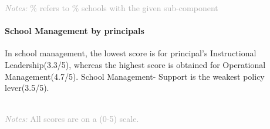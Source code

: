 \documentclass[
  twocolumn]{article}
\begin{document}
\begin{table}[H]
    {\scriptsize
    \textcolor{darkgray}{\textit{Notes:} \% refers to \% schools with the given sub-component}
  }

\end{table}

\hypertarget{school-management-by-principals}{%
\paragraph{\texorpdfstring{\textbf{School Management by
principals}}{School Management by principals}}\label{school-management-by-principals}}

In school management, the lowest score is for principal's Instructional
Leadership(3.3/5), whereas the highest score is obtained for Operational
Management(4.7/5). School Management- Support is the weakest policy
lever(3.5/5).

\begin{table}[H]
\\

    {\scriptsize
    \textcolor{darkgray}{\textit{Notes:} All scores are on a (0-5) scale.}
  }

\end{table}
\end{document}
